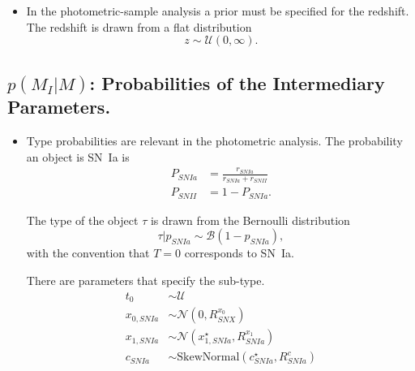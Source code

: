 \documentclass[preprint,3p]{elsarticle}
\begin{document}
\begin{itemize}
\item 
In the photometric-sample analysis a prior must be specified for the redshift.  The redshift is drawn from a flat distribution
\begin{equation}
z\sim \mathcal{U}(0,\infty).
\end{equation}
\end{itemize}

\subsection{$p(M_I|M)$: Probabilities of the Intermediary Parameters.}
\begin{itemize}
\item Type probabilities are relevant in the photometric analysis.
The probability an object is SN~Ia is
\begin{align}
P_{SNIa} &= \frac{r_{SNIa}}{r_{SNIa}+r_{SNII}} \nonumber \\
P_{SNII}&=1-P_{SNIa}.
\label{prob:eqn}
\end{align}

The type of the object $\tau$ is drawn from the Bernoulli distribution 
\begin{equation}
\tau | p_{SNIa} \sim \mathcal{B}(1-p_{SNIa}),
\end{equation}
with the convention that $T=0$ corresponds to SN~Ia.

There are parameters that specify the sub-type.
\begin{align}
t_0 & \sim \mathcal{U}\\
x_{0, SNIa} & \sim \mathcal{N}(0,R^{x_0}_{SNX})\\
x_{1,SNIa} & \sim \mathcal{N}(x_{1,SNIa}^\star,R^{x_1}_{SNIa})\\
c_{SNIa} & \sim \text{SkewNormal}(c^\star_{SNIa},R^{c}_{SNIa} )
\end{align}

\end{itemize}
\end{document}
